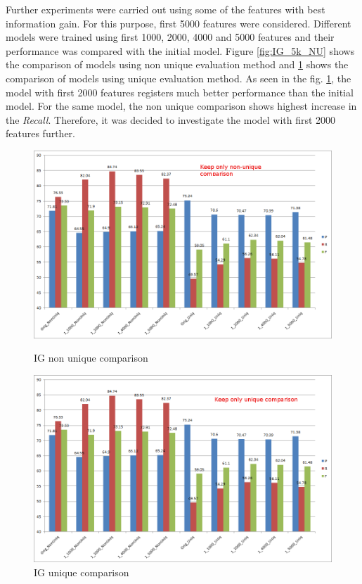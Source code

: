 Further experiments were carried out using some of the features with best information gain. For this purpose, first 5000 features were considered. Different models were trained using first 1000, 2000, 4000 and 5000 features and their performance was compared with the initial model.  Figure \ref{fig:IG_5k_NU} shows the comparison of models using non unique evaluation method and \ref{fig:IG_5k_U} shows the comparison of models using unique evaluation method. As seen in the fig. \ref{fig:IG_5k_U}, the model with first 2000 features registers much better performance than the initial model. For the same model, the non unique comparison shows highest increase in the \textit{Recall}. Therefore, it was decided to investigate the model with first 2000 features further.

\begin{figure}
\centering
\begin{minipage}{.5\textwidth}
  \centering
  \includegraphics[width=.95\textwidth]{figures/IGFirst5k_NU.png}
  \caption{IG non unique comparison}
  \label{fig:IG_5k_NU}
\end{minipage}%
\begin{minipage}{.5\textwidth}
  \centering
  \includegraphics[width=.95\textwidth]{figures/IGFirst5k_U.png}
  \caption{IG unique comparison}
  \label{fig:IG_5k_U}
\end{minipage}
\end{figure} 


